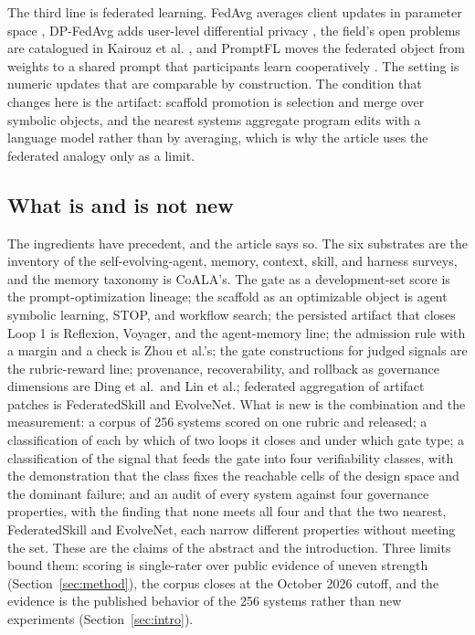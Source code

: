 \documentclass[
  11pt,
]{article}
\newcounter{none} %
\begin{document}
The third line is federated learning. FedAvg averages client updates in parameter space \cite{mcmahan2017fedavg}, DP-FedAvg adds user-level differential privacy \cite{mcmahan2018dpfedavg}, the field's open problems are catalogued in Kairouz et al. \cite{kairouz2021federated}, and PromptFL moves the federated object from weights to a shared prompt that participants learn cooperatively \cite{guo2022promptfl}. The setting is numeric updates that are comparable by construction. The condition that changes here is the artifact: scaffold promotion is selection and merge over symbolic objects, and the nearest systems aggregate program edits with a language model rather than by averaging, which is why the article uses the federated analogy only as a limit.

\subsection{What is and is not new}\label{app:related-5}

The ingredients have precedent, and the article says so. The six substrates are the inventory of the self-evolving-agent, memory, context, skill, and harness surveys, and the memory taxonomy is CoALA's. The gate as a development-set score is the prompt-optimization lineage; the scaffold as an optimizable object is agent symbolic learning, STOP, and workflow search; the persisted artifact that closes Loop 1 is Reflexion, Voyager, and the agent-memory line; the admission rule with a margin and a check is Zhou et al.'s; the gate constructions for judged signals are the rubric-reward line; provenance, recoverability, and rollback as governance dimensions are Ding et al.~and Lin et al.; federated aggregation of artifact patches is FederatedSkill and EvolveNet. What is new is the combination and the measurement: a corpus of 256 systems scored on one rubric and released; a classification of each by which of two loops it closes and under which gate type; a classification of the signal that feeds the gate into four verifiability classes, with the demonstration that the class fixes the reachable cells of the design space and the dominant failure; and an audit of every system against four governance properties, with the finding that none meets all four and that the two nearest, FederatedSkill and EvolveNet, each narrow different properties without meeting the set. These are the claims of the abstract and the introduction. Three limits bound them: scoring is single-rater over public evidence of uneven strength (Section~\ref{sec:method}), the corpus closes at the October 2026 cutoff, and the evidence is the published behavior of the 256 systems rather than new experiments (Section~\ref{sec:intro}).
\end{document}
